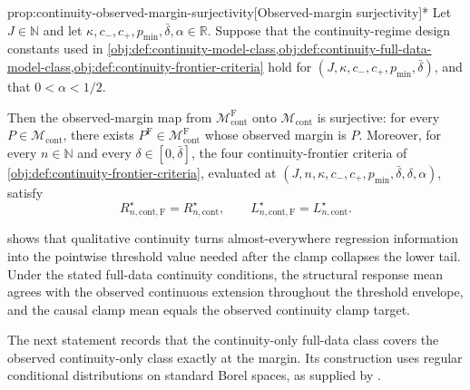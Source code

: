 \begin{propositionv}{prop:continuity-observed-margin-surjectivity}[Observed-margin surjectivity]*
Let \(J\in\mathbb N\) and let \(\kappa,c_-,c_+,p_{\min},\bar\delta,\alpha\in\mathbb R\). Suppose that the continuity-regime design constants used in \cref{obj:def:continuity-model-class,obj:def:continuity-full-data-model-class,obj:def:continuity-frontier-criteria} hold for \((J,\kappa,c_-,c_+,p_{\min},\bar\delta)\), and that \(0<\alpha<1/2\).

Then the observed-margin map from \(\mathcal M_{\mathrm{cont}}^{\mathrm F}\) onto \(\mathcal M_{\mathrm{cont}}\) is surjective: for every \(P\in\mathcal M_{\mathrm{cont}}\), there exists \(P^{\mathrm F}\in\mathcal M_{\mathrm{cont}}^{\mathrm F}\) whose observed margin is \(P\). Moreover, for every \(n\in\mathbb N\) and every \(\delta\in[0,\bar\delta]\), the four continuity-frontier criteria of \cref{obj:def:continuity-frontier-criteria}, evaluated at \((J,n,\kappa,c_-,c_+,p_{\min},\bar\delta,\delta,\alpha)\), satisfy
\[
R_{n,\mathrm{cont},\mathrm F}^\star
=
R_{n,\mathrm{cont}}^\star,
\qquad
L_{n,\mathrm{cont},\mathrm F}^\star
=
L_{n,\mathrm{cont}}^\star .
\]
\end{propositionv}

 shows that qualitative continuity turns almost-everywhere regression information into the pointwise threshold value needed after the clamp collapses the lower tail. Under the stated full-data continuity conditions, the structural response mean agrees with the observed continuous extension throughout the threshold envelope, and the causal clamp mean equals the observed continuity clamp target.

The next statement records that the continuity-only full-data class covers the observed continuity-only class exactly at the margin. Its construction uses regular conditional distributions on standard Borel spaces, as supplied by \citet[Theorem~6.3]{Kallenberg2002Foundations}.

